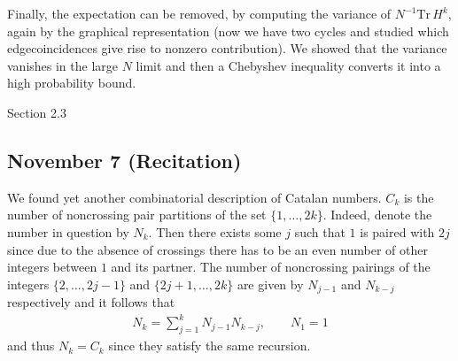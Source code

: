 \documentclass[letterpaper,10pt,english]{sphinxhowto}
\begin{document}
\sphinxAtStartPar
Finally, the expectation can be removed, by computing the variance of
\(N^{-1} \text{Tr}\, H^k\), again by the graphical representation (now we have two cycles and studied which edge\sphinxhyphen{}coincidences give rise to nonzero contribution). We showed that the variance vanishes in the large \(N\) limit and then a Chebyshev inequality converts it into a high probability bound.

\sphinxAtStartPar
{}  Section 2.3


\subsection{November 7 (Recitation)}
\label{\detokenize{teaching/random_matrices_2017:november-7-recitation}}
\sphinxAtStartPar
We found yet another combinatorial description of Catalan numbers. \(C_k\) is the number of non\sphinxhyphen{}crossing pair partitions of the set \(\{1,\dots,2k\}\). Indeed, denote the number in question by \(N_k\). Then there exists some \(j\) such that \(1\) is paired with \(2j\) since due to the absence of crossings there has to be an even number of other integers between \(1\) and its partner. The number of non\sphinxhyphen{}crossing pairings of the integers \(\{2,\dots,2j-1\}\) and \(\{2j+1,\dots,2k\}\) are given by \(N_{j-1}\) and \(N_{k-j}\) respectively and it follows that
\begin{equation*}
\begin{split}
N_{k}=\sum_{j=1}^k N_{j-1}N_{k-j}, \qquad N_1=1
\end{split}
\end{equation*}
and thus \(N_k=C_k\) since they satisfy the same recursion.
\end{document}
